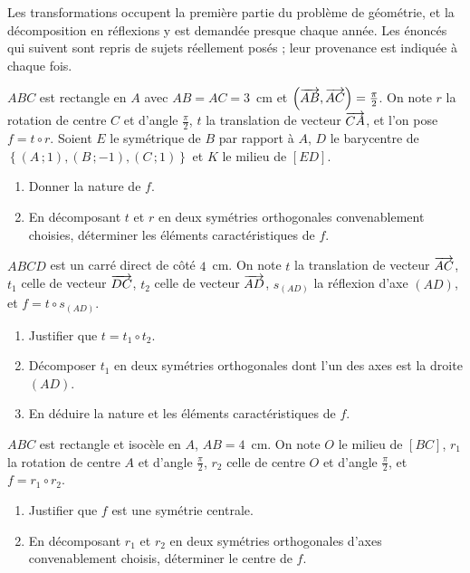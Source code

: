 \begin{annales}
Les transformations occupent la première partie du problème de géométrie, et
la décomposition en réflexions y est demandée presque chaque année. Les
énoncés qui suivent sont repris de sujets réellement posés ; leur provenance
est indiquée à chaque fois.

$ABC$ est rectangle en $A$ avec $AB = AC = 3$~cm et
$\left(\overrightarrow{AB},\overrightarrow{AC}\right) = \frac{\pi}{2}$. On note $r$ la rotation de
centre $C$ et d'angle $\frac{\pi}{2}$, $t$ la translation de vecteur
$\overrightarrow{CA}$, et l'on pose $f = t \circ r$. Soient $E$ le symétrique de $B$ par
rapport à $A$, $D$ le barycentre de
$\left\{(A\,;1),(B\,;-1),(C\,;1)\right\}$ et $K$ le milieu de $[ED]$.
\begin{enumerate}[label=\textbf{\alph*)}, leftmargin=*, itemsep=0.15em]
  \item Donner la nature de $f$.
  \item En décomposant $t$ et $r$ en deux symétries orthogonales
        convenablement choisies, déterminer les éléments caractéristiques de
        $f$.
\end{enumerate}

$ABCD$ est un carré direct de côté $4$~cm. On note $t$ la translation de
vecteur $\overrightarrow{AC}$, $t_{1}$ celle de vecteur $\overrightarrow{DC}$, $t_{2}$ celle de
vecteur $\overrightarrow{AD}$, $s_{(AD)}$ la réflexion d'axe $(AD)$, et
$f = t \circ s_{(AD)}$.
\begin{enumerate}[label=\textbf{\alph*)}, leftmargin=*, itemsep=0.15em]
  \item Justifier que $t = t_{1} \circ t_{2}$.
  \item Décomposer $t_{1}$ en deux symétries orthogonales dont l'un des axes
        est la droite $(AD)$.
  \item En déduire la nature et les éléments caractéristiques de $f$.
\end{enumerate}

$ABC$ est rectangle et isocèle en $A$, $AB = 4$~cm. On note $O$ le milieu de
$[BC]$, $r_{1}$ la rotation de centre $A$ et d'angle $\frac{\pi}{2}$,
$r_{2}$ celle de centre $O$ et d'angle $\frac{\pi}{2}$, et $f = r_{1} \circ
r_{2}$.
\begin{enumerate}[label=\textbf{\alph*)}, leftmargin=*, itemsep=0.15em]
  \item Justifier que $f$ est une symétrie centrale.
  \item En décomposant $r_{1}$ et $r_{2}$ en deux symétries orthogonales
        d'axes convenablement choisis, déterminer le centre de $f$.
\end{enumerate}


\end{annales}
